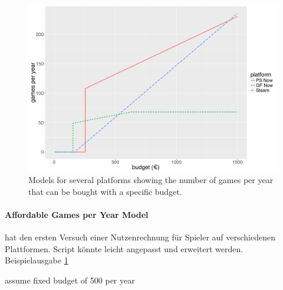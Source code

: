 \begin{figure}[!t]
	\centering
	\includegraphics[width=1.0\columnwidth]{images/gamesperyear-over-budget.pdf}
	\caption{Models for several platforms showing the number of games per year that can be bought with a specific budget.}
\label{fig:gamesperyear-over-budget}
\end{figure}



\paragraph{Affordable Games per Year Model}


 hat den ersten Versuch einer Nutzenrechnung für Spieler auf verschiedenen Plattformen. Script könnte leicht angepasst und erweitert werden. Beispielausgabe \ref{fig:gamesperyear-over-budget}


assume fixed budget of 500 per year

